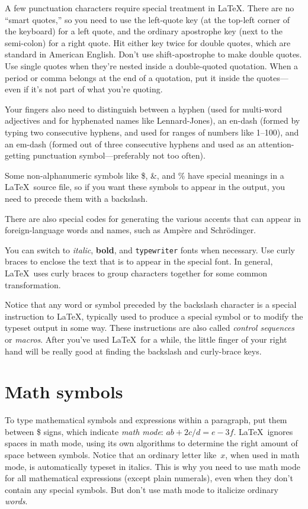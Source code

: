 \documentclass[prb,preprint]{revtex4-1}
\begin{document}
A few punctuation characters require special treatment in \LaTeX. There 
are no ``smart quotes,'' so you need to use the left-quote key (at the 
top-left corner of the keyboard) for a left quote, and the ordinary apostrophe
key (next to the semi-colon) for a right quote. Hit either key twice for double
quotes, which are standard in American English.  Don't use shift-apostrophe
to make double quotes.  Use single quotes when they're nested inside a 
double-quoted quotation.  When a period or comma belongs at the end of
a quotation, put it inside the quotes---even if it's not part of what you're
quoting.\cite{nevermindlogic}

Your fingers also need to distinguish between a hyphen (used for
multi-word adjectives and for hyphenated names like Lennard-Jones), an 
en-dash (formed by typing two consecutive hyphens, and used for ranges 
of numbers like 1--100), and an em-dash (formed out of three consecutive
hyphens and used as an attention-getting punctuation symbol---preferably 
not too often).

Some non-alphanumeric symbols like \$, \&, and \% have special meanings 
in a \LaTeX\ source file, so if you want these symbols to appear in the output, 
you need to precede them with a backslash.

There are also special codes for generating the various accents
that can appear in foreign-language words and names, such as Amp\`ere
and Schr\"odinger.\cite{FontEncodingComment}

You can switch to \textit{italic}, \textbf{bold}, and \texttt{typewriter} fonts
when necessary. Use curly braces to enclose the text that is to appear in 
the special font. In general, \LaTeX\ uses curly braces to group characters 
together for some common transformation.

Notice that any word or symbol preceded by the backslash character is
a special instruction to \LaTeX, typically used to produce a special 
symbol or to modify the typeset output in some way. These instructions 
are also called \textit{control sequences} or \textit{macros}.  
After you've used \LaTeX\ for a while, the little finger of your right 
hand will be really good at finding the backslash and curly-brace keys.


\section{Math symbols}

To type mathematical symbols and expressions within a paragraph, put
them between \$ signs, which indicate \textit{math mode}: $ab + 2c/d = e-3f$.
\LaTeX\ ignores spaces in math mode, using its own algorithms to determine
the right amount of space between symbols.  Notice that an ordinary letter 
like~$x$, when used in math mode, is automatically typeset in italics. 
This is why you need to use math mode for all mathematical
expressions (except plain numerals), even when they don't contain any 
special symbols.  But don't use math mode to italicize ordinary \textit{words}.
\end{document}
